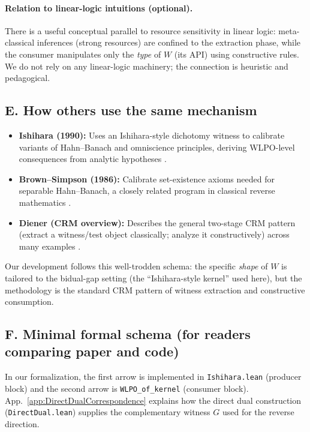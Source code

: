 \documentclass[11pt]{article}
\begin{document}
\paragraph{Relation to linear-logic intuitions (optional).}
There is a useful conceptual parallel to resource sensitivity in linear logic: meta-classical inferences (strong resources) are confined to the extraction phase, while the consumer manipulates only the \emph{type} of $W$ (its API) using constructive rules. We do not rely on any linear-logic machinery; the connection is heuristic and pedagogical.

\subsection*{E. How others use the same mechanism}
\begin{itemize}
\item \textbf{Ishihara (1990):} Uses an Ishihara-style dichotomy witness to calibrate variants of Hahn--Banach and omniscience principles, deriving WLPO-level consequences from analytic hypotheses \cite{Ishihara90}.
\item \textbf{Brown--Simpson (1986):} Calibrate set-existence axioms needed for separable Hahn--Banach, a closely related program in classical reverse mathematics \cite{BrownSimpson86}.
\item \textbf{Diener (CRM overview):} Describes the general two-stage CRM pattern (extract a witness/test object classically; analyze it constructively) across many examples \cite{DienerCRM}.
\end{itemize}

Our development follows this well-trodden schema: the specific \emph{shape} of $W$ is tailored to the bidual-gap setting (the ``Ishihara-style kernel'' used here), but the methodology is the standard CRM pattern of witness extraction and constructive consumption.

\subsection*{F. Minimal formal schema (for readers comparing paper and code)}

\begin{center}
\end{center}

In our formalization, the first arrow is implemented in \texttt{Ishihara.lean} (producer block) and the second arrow is \texttt{WLPO\_of\_kernel} (consumer block). App.~\ref{app:DirectDualCorrespondence} explains how the direct dual construction (\texttt{DirectDual.lean}) supplies the complementary witness $G$ used for the reverse direction.
\end{document}
